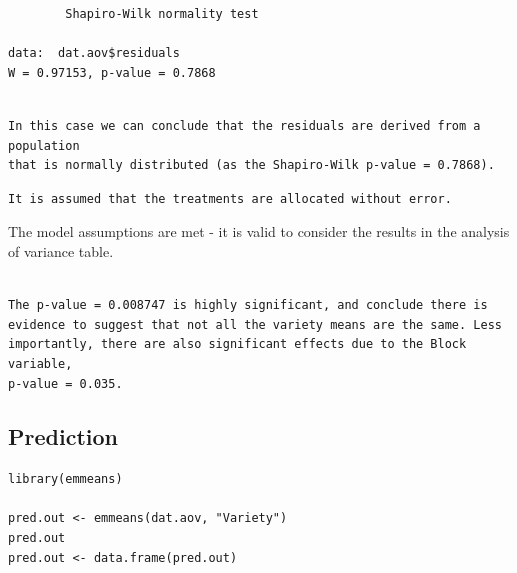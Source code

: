\documentclass[a4paper, 10pt, fleqn, twosided]{memoir}
\begin{document}
\begin{tcolorbox}[title = Example 3 Shapiro-Wilk normality test output]
\begin{verbatim}
        Shapiro-Wilk normality test

data:  dat.aov$residuals
W = 0.97153, p-value = 0.7868
\end{verbatim}
\end{tcolorbox}


\begin{tcolorbox}[title = Example 3 Shapiro-Wilk normality test interpretation]
\begin{verbatim}

In this case we can conclude that the residuals are derived from a population
that is normally distributed (as the Shapiro-Wilk p-value = 0.7868).

\end{verbatim}
\end{tcolorbox}



\begin{tcolorbox}[title = Example 3 Assumption 5]
\begin{verbatim}
It is assumed that the treatments are allocated without error.
\end{verbatim}
\end{tcolorbox}

The model assumptions are met - it is valid to consider the results in the analysis of variance table.

\begin{tcolorbox}[title = Example 3 ANOVA interpretation]
\begin{verbatim}

The p-value = 0.008747 is highly significant, and conclude there is
evidence to suggest that not all the variety means are the same. Less
importantly, there are also significant effects due to the Block variable,
p-value = 0.035.

\end{verbatim}
\end{tcolorbox}
\subsection{Prediction}

\begin{tcolorbox}[title = Example 3 predicted values]
\begin{verbatim}
library(emmeans)

pred.out <- emmeans(dat.aov, "Variety")
pred.out
pred.out <- data.frame(pred.out)

\end{verbatim}
\end{tcolorbox}
\end{document}
